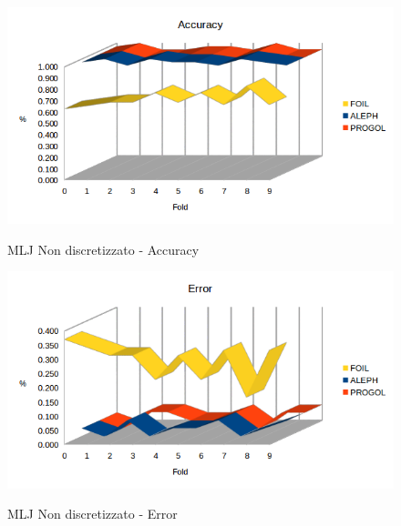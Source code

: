 \begin{figure}[H]
	\includegraphics[width=1.1\textwidth]{img/datasetGraph/mlj/nodiscr/accuracy.png}
	\label{mljnodiscr-Accuracy}
	\caption{MLJ Non discretizzato - Accuracy}
\end{figure}

\begin{figure}[H]
	\includegraphics[width=1.1\textwidth]{img/datasetGraph/mlj/nodiscr/error.png}
	\label{mljnodiscr-Error}
	\caption{MLJ Non discretizzato - Error}
\end{figure}

